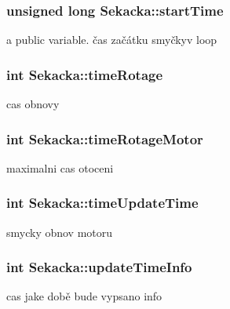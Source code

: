 \subsubsection[{\texorpdfstring{start\+Time}{startTime}}]{\setlength{\rightskip}{0pt plus 5cm}unsigned long Sekacka\+::start\+Time\hspace{0.3cm}{\ttfamily [private]}}\hypertarget{class_sekacka_a34c88c43f0c6573f8005d7d40ccbec75}{}\label{class_sekacka_a34c88c43f0c6573f8005d7d40ccbec75}
a public variable. čas začátku smyčkyv loop 
\subsubsection[{\texorpdfstring{time\+Rotage}{timeRotage}}]{\setlength{\rightskip}{0pt plus 5cm}int Sekacka\+::time\+Rotage\hspace{0.3cm}{\ttfamily [private]}}\hypertarget{class_sekacka_a82a00364ae6395253285518471f3132b}{}\label{class_sekacka_a82a00364ae6395253285518471f3132b}
cas obnovy 
\subsubsection[{\texorpdfstring{time\+Rotage\+Motor}{timeRotageMotor}}]{\setlength{\rightskip}{0pt plus 5cm}int Sekacka\+::time\+Rotage\+Motor\hspace{0.3cm}{\ttfamily [private]}}\hypertarget{class_sekacka_a87ae7490a2de5bfd9f8a6e5e2f09b207}{}\label{class_sekacka_a87ae7490a2de5bfd9f8a6e5e2f09b207}
maximalni cas otoceni 
\subsubsection[{\texorpdfstring{time\+Update\+Time}{timeUpdateTime}}]{\setlength{\rightskip}{0pt plus 5cm}int Sekacka\+::time\+Update\+Time\hspace{0.3cm}{\ttfamily [private]}}\hypertarget{class_sekacka_a0407757c0371f299eac49abf5feb1f77}{}\label{class_sekacka_a0407757c0371f299eac49abf5feb1f77}
smycky obnov motoru 
\subsubsection[{\texorpdfstring{update\+Time\+Info}{updateTimeInfo}}]{\setlength{\rightskip}{0pt plus 5cm}int Sekacka\+::update\+Time\+Info\hspace{0.3cm}{\ttfamily [private]}}\hypertarget{class_sekacka_a796c17e80ad5c084b336197e609c2f0e}{}\label{class_sekacka_a796c17e80ad5c084b336197e609c2f0e}
cas jake době bude vypsano info 

